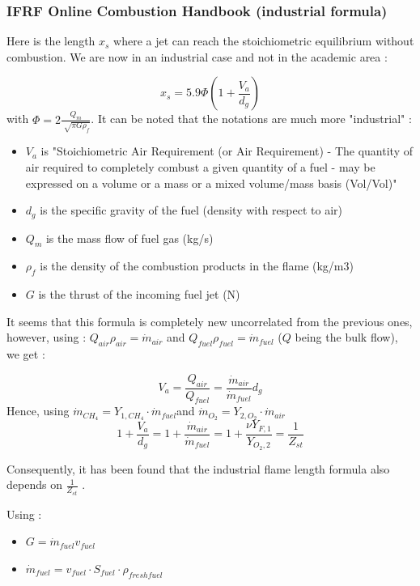 \subsubsection{IFRF Online Combustion Handbook (industrial formula)\cite{neil_fricker_ifrf_2001}}

Here is the length $x_{s}$ where a jet can reach the stoichiometric equilibrium without combustion. We are now in an industrial case and not in the academic area :

\begin{equation}
x_{s}=5.9\Phi (1+\frac{V_{a}}{d_{g}})
\end{equation} with $\Phi=2\frac{Q_{m}}{\sqrt[]{\pi G \rho_{f}}}$. It can be noted that the notations are much more "industrial" :
\begin{itemize}
\item $V_{a}$ is "Stoichiometric Air Requirement (or Air Requirement) - The quantity of air required to completely combust a given quantity of a fuel - may be expressed on a volume or a mass or a mixed volume/mass basis (Vol/Vol)"
\item $d_{g}$ is the specific gravity of the fuel (density with respect to air)
\item $Q_{m}$ is the mass flow of fuel gas (kg/s)
\item $\rho_{f}$ is the density of the combustion products in the flame (kg/m3)
\item $G$ is the thrust of the incoming fuel jet (N)
\end{itemize}

It seems that this formula is completely new uncorrelated from the previous ones, however, using :
$Q_{air}\rho_{air}= \dot{m}_{air}$ and $Q_{fuel}\rho_{fuel}= \dot{m}_{fuel}$  ($Q$ being the bulk flow), we get :

\begin{equation}
V_{a}=\frac{Q_{air}}{Q_{fuel}}=\frac{ \dot{m}_{air}}{ \dot{m}_{fuel}}d_{g}
\end{equation}
Hence, using $\dot{m}_{CH_{4}}=Y_{1,CH_{4}}\cdot \dot{m}_{fuel}$and $\dot{m}_{O_{2}}=Y_{2,O_{2}}\cdot \dot{m}_{air}$
\begin{equation}
1+\frac{V_{a}}{d_{g}}=1+\frac{ \dot{m}_{air}}{ \dot{m}_{fuel}}=1+\frac{\nu Y_{F,1}}{Y_{O_{2},2}}=\frac{1}{Z_{st}}
\end{equation}

Consequently, it has been found that the industrial flame length formula also depends on $\frac{1}{Z_{st}}$ .

Using :
\begin{itemize}
\item $G=\dot m_{fuel} v_{fuel}$
\item $\dot m_{fuel}= v_{fuel} \cdot S_{fuel} \cdot \rho_{fresh fuel}$
\end{itemize}

